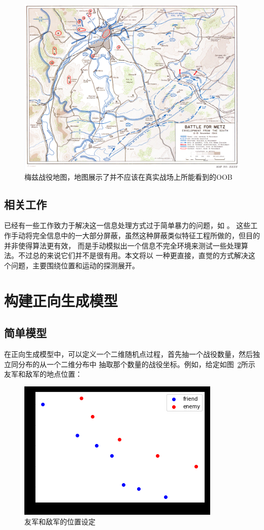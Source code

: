 \documentclass{sicnuthesis}
\begin{document}
\begin{figure}[htb]
\includegraphics[width=0.6\linewidth]{metz.jpg}
\caption{
梅兹战役地图，地图展示了并不应该在真实战场上所能看到的OOB }
\label{fig:metz}
\end{figure}

\subsection{相关工作}

已经有一些工作致力于解决这一信息处理方式过于简单暴力的问题，如
\cite{hostetler2012inferring} \cite{vsmejkal2016integrating} \cite{touhou}。
这些工作手动将完全信息中的一大部分屏蔽，虽然这种屏蔽类似特征工程所做的，但目的并非使得算法更有效，
而是手动模拟出一个信息不完全环境来测试一些处理算法。不过总的来说它们并不是很有用。本文将以
一种更直接，直觉的方式解决这个问题，主要围绕位置和运动的探测展开。


\clearpage
\section{构建正向生成模型}

\subsection{简单模型}

在正向生成模型中，可以定义一个二维随机点过程，首先抽一个战役数量，然后独立同分布的从一个二维分布中
抽取那个数量的战役坐标。例如，给定如图~\ref{fig:stateNoBattle}所示友军和敌军的地点位置：

\begin{figure}[htb]
\includegraphics{state_no_battle.png}
\caption{
友军和敌军的位置设定}
\label{fig:stateNoBattle}
\end{figure}
\end{document}
